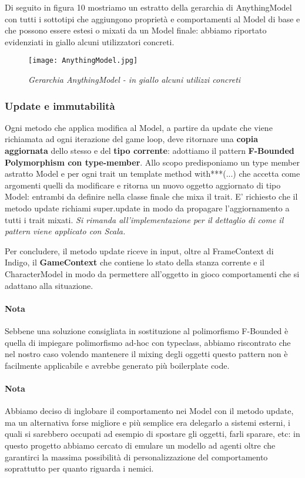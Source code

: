 Di seguito in figura 10 mostriamo un estratto della gerarchia di AnythingModel con tutti i sottotipi che aggiungono proprietà e comportamenti al Model di base e che possono essere estesi o mixati da un Model finale: abbiamo riportato evidenziati in giallo alcuni utilizzatori concreti.

\begin{figure}[!hbt]
    \centering
    \texttt{[image: AnythingModel.jpg]}
    \caption{\textit{Gerarchia AnythingModel - in giallo alcuni utilizzi concreti}} 
\end{figure}

\subsubsection{Update e immutabilità}

Ogni metodo che applica modifica al Model, a partire da update che viene richiamata ad ogni iterazione del game loop, deve ritornare una \textbf{copia aggiornata} dello stesso e del \textbf{tipo corrente}: adottiamo il pattern \textbf{F-Bounded Polymorphism con type-member}. 
Allo scopo predisponiamo un type member astratto Model e per ogni trait un template method with***(...) che accetta come argomenti quelli da modificare e ritorna un nuovo oggetto aggiornato di tipo Model: entrambi da definire nella classe finale che mixa il trait.
E' richiesto che il metodo update richiami super.update in modo da propagare l'aggiornamento a tutti i trait mixati.
\textit{Si rimanda all'implementazione per il dettaglio di come il pattern viene applicato con Scala.}

Per concludere, il metodo update riceve in input, oltre al FrameContext di Indigo, il \textbf{GameContext} che contiene lo stato della stanza corrente e il CharacterModel in modo da permettere all'oggetto in gioco comportamenti che si adattano alla situazione.

\paragraph{Nota} Sebbene una soluzione consigliata in sostituzione al polimorfismo F-Bounded è quella di impiegare polimorfismo ad-hoc con typeclass, abbiamo riscontrato che nel nostro caso volendo mantenere il mixing degli oggetti questo pattern non è facilmente applicabile e avrebbe generato più boilerplate code.

\paragraph{Nota}
Abbiamo deciso di inglobare il comportamento nei Model con il metodo update, ma un alternativa forse migliore e più semplice era delegarlo a sistemi esterni, i quali si sarebbero occupati ad esempio di spostare gli oggetti, farli sparare, etc: in questo progetto abbiamo cercato di emulare un modello ad agenti oltre che garantirci la massima possibilità di personalizzazione del comportamento soprattutto per quanto riguarda i nemici. 


